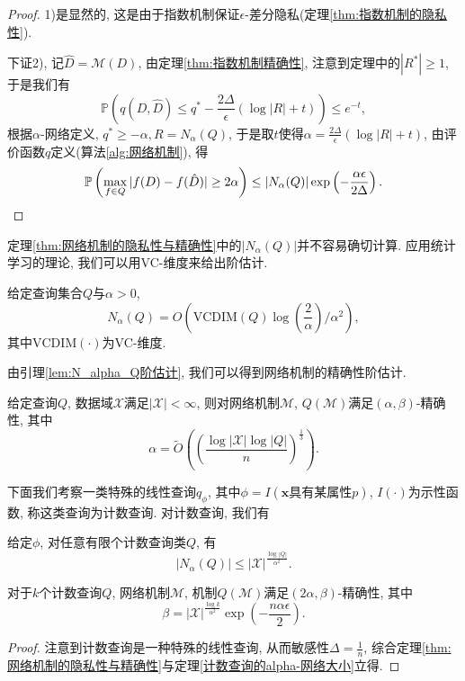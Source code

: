 \begin{proof}
  1)是显然的, 这是由于指数机制保证$\epsilon$-差分隐私(定理\ref{thm:指数机制的隐私性}).
  
  下证2), 记$\hat{D} = \mathcal{M}(D)$, 由定理\ref{thm:指数机制精确性}, 注意到定理中的$|R^*|\ge 1$, 于是我们有
  \[
    \mathbb P\left(q(D, \hat{D})\le q^* - \frac{2\Delta}{\epsilon}(\log|R| + t)\right) \le e^{-t},
  \]
  根据$\alpha$-网络定义, $q^*\ge -\alpha, R = N_\alpha(Q)$, 于是取$t$使得$\alpha = \frac{2\Delta}{\epsilon}(\log|R| + t)$, 由评价函数$q$定义(算法\ref{alg:网络机制}), 得
  \[
    \mathbb P\left(\max_{f\in Q}|f(D) - f(\hat{D})|\ge 2\alpha \right) \le |N_\alpha(Q)|\exp\left(-\frac{\alpha\epsilon}{2\Delta}\right). \qedhere
  \]
\end{proof}
定理\ref{thm:网络机制的隐私性与精确性}中的$|N_\alpha(Q)|$并不容易确切计算. 应用统计学习的理论, 我们可以用VC-维度来给出阶估计.
\begin{lem}\label{lem:N_alpha_Q阶估计}
  给定查询集合$Q$与$\alpha > 0$, 
  \[
    N_\alpha(Q) = O\left(\mathrm{VCDIM}(Q)\log(\frac{2}{\alpha})/\alpha^2\right),
  \]
  其中$\mathrm{VCDIM}(\cdot)$为VC-维度.
\end{lem}
由引理\ref{lem:N_alpha_Q阶估计}, 我们可以得到网络机制的精确性阶估计.
\begin{thm}\label{thm:网络机制精确性阶估计}
  给定查询$Q$, 数据域$\mathcal{X}$满足$|\mathcal{X}|<\infty$, 则对网络机制$\mathcal{M}$, $Q(\mathcal{M})$满足$(\alpha, \beta)$-精确性, 其中
  \[
    \alpha = \tilde{O}\left(\left(\frac{\log|\mathcal{X}|\log|Q|}{n}\right)^{\frac{1}{3}}\right). 
  \]
\end{thm}
下面我们考察一类特殊的线性查询$q_\phi$, 其中$\phi = I(\text{$\mathbf{x}$具有某属性$p$})$, $I(\cdot)$为示性函数, 称这类查询为计数查询. 对计数查询, 我们有
\begin{thm}\label{计数查询的alpha-网络大小}
  给定$\phi$, 对任意有限个计数查询类$Q$, 有
  \[
    |N_\alpha(Q)| \le |\mathcal{X}|^{\frac{\log|Q|}{\alpha^2}}.
  \]
\end{thm}
\begin{prop}[网络机制在计数查询上的精确性]\label{prop:网络机制在计数查询上的精确性}
  对于$k$个计数查询$Q$, 网络机制$\mathcal{M}$, 机制$Q(\mathcal{M})$满足$(2\alpha, \beta)$-精确性, 其中
  \[
    \beta = |\mathcal{X}|^{\frac{\log k}{\alpha^2}}\exp\left(-\frac{n\alpha\epsilon}{2}\right).
  \]
\end{prop}
\begin{proof}
  注意到计数查询是一种特殊的线性查询, 从而敏感性$\Delta = \frac{1}{n}$, 综合定理\ref{thm:网络机制的隐私性与精确性}与定理\ref{计数查询的alpha-网络大小}立得.
\end{proof}

